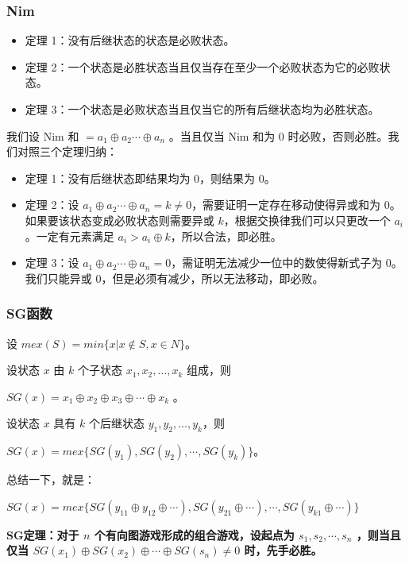 \documentclass[a4paper,11pt]{article}
\begin{document}
\subsubsection{Nim}
\begin{itemize}
\item
  定理 1：没有后继状态的状态是必败状态。
\item
  定理 2：一个状态是必胜状态当且仅当存在至少一个必败状态为它的必败状态。
\item
  定理 3：一个状态是必败状态当且仅当它的所有后继状态均为必胜状态。
\end{itemize}

我们设 Nim 和 \(=a_1 \oplus a_2\cdots \oplus a_n\) 。当且仅当 Nim 和为 0
时必败，否则必胜。我们对照三个定理归纳：

\begin{itemize}
\item
  定理 1：没有后继状态即结果均为 0，则结果为 0。
\item
  定理 2：设
  \(a_1 \oplus a_2\cdots \oplus a_n=k\not=0\)，需要证明一定存在移动使得异或和为
  0。如果要该状态变成必败状态则需要异或
  \(k\)，根据交换律我们可以只更改一个 \(a_i\)。一定有元素满足
  \(a_i>a_i \oplus k\)，所以合法，即必胜。
\item
  定理 3：设
  \(a_1 \oplus a_2\cdots \oplus a_n=0\)，需证明无法减少一位中的数使得新式子为
  0。我们只能异或 0，但是必须有减少，所以无法移动，即必败。
\end{itemize}
\subsubsection{SG函数}
设 \(mex(S)=min\lbrace {x|x\not\in S,x\in N}\rbrace\)。

设状态 \(x\) 由 \(k\) 个子状态 \(x_1,x_2,\dots,x_k\) 组成，则

\(SG(x)=x_1\oplus x_2\oplus x_3\oplus \cdots \oplus x_k\) 。

设状态 \(x\) 具有 \(k\) 个后继状态 \(y_1,y_2,\dots,y_k\)，则

\(SG(x)=mex\lbrace{SG(y_1),SG(y_2),\cdots,SG(y_k)}\rbrace\)。

总结一下，就是：

\(SG(x)=mex\lbrace{SG(y_{11}\oplus y_{12} \oplus \cdots),SG(y_{21}\oplus \cdots),\cdots,SG(y_{k1}\oplus \cdots)}\rbrace\)

\textbf{SG定理：对于 \(n\) 个有向图游戏形成的组合游戏，设起点为
\(s_1,s_2,\cdots,s_n\) ，则当且仅当
\(SG(x_1)\oplus SG(x_2)\oplus \cdots \oplus SG(s_n)\not=0\)
时，先手必胜。}
\end{document}
